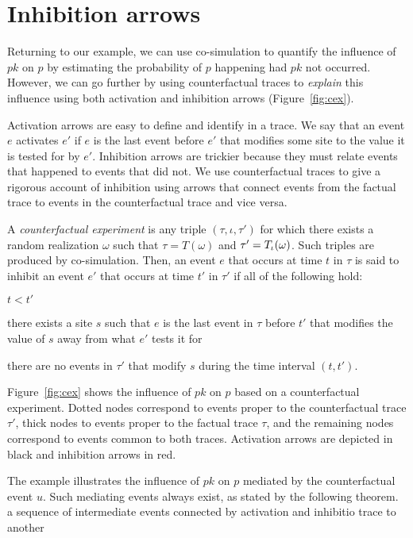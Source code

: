 \section{Inhibition arrows}\label{sec:inhibition}

Returning to our example, we can use co-simulation to quantify the
influence of $pk$ on $p$ by estimating the probability of $p$
happening had $pk$ not occurred. However, we can go further by using
counterfactual traces to \textit{explain} this influence using both
activation and inhibition arrows (Figure~\ref{fig:cex}).

Activation arrows are easy to define and identify in a trace. We say
that an event $e$ activates $e'$ if $e$ is the last event before $e'$
that modifies some site to the value it is tested for by
$e'$. Inhibition arrows are trickier because they must relate events
that happened to events that did not. We use counterfactual traces to
give a rigorous account of inhibition using arrows that connect events
from the factual trace to events in the counterfactual trace and vice
versa.

A \textit{counterfactual experiment} is any triple
$(\tau, \iota, \tau')$ for which there exists a random realization
$\omega$ such that $\tau = T(\omega)$ and $\tau' =
{T_\iota}{}(\omega)$. Such triples are produced by co-simulation. Then,
an event $e$ that occurs at time $t$ in $\tau$ is said to inhibit an
event $e'$ that occurs at time $t'$ in $\tau'$ if all of the following
hold:
\begin{inparaenum}[(i)]
\item $t < t'$
\item there exists a site $s$ such that $e$ is the last event in
  $\tau$ before $t'$ that modifies the value of $s$ away from what
  $e'$ tests it for
\item there are no events in $\tau'$ that modify $s$ during the time
  interval $(t, t')$.
\end{inparaenum}



Figure~\ref{fig:cex} shows the influence of $pk$ on $p$ based on a
counterfactual experiment. Dotted nodes correspond to events proper to
the counterfactual trace $\tau'$, thick nodes to events proper to the
factual trace $\tau$, and the remaining nodes correspond to events
common to both traces. Activation arrows are depicted in black and
inhibition arrows in red.

The example illustrates the influence of $pk$ on $p$ mediated by the
counterfactual event $u$. Such mediating events always exist, as
stated by the following theorem.  %
a sequence of intermediate events connected by activation and
inhibitio%
trace to another %


